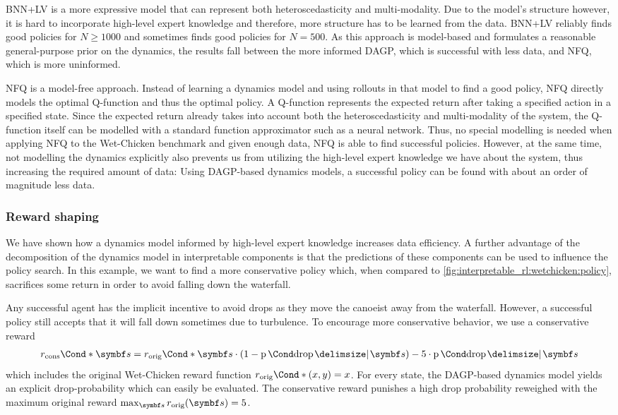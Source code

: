 BNN+LV is a more expressive model that can represent both heteroscedasticity and multi-modality.
Due to the model's structure however, it is hard to incorporate high-level expert knowledge and therefore, more structure has to be learned from the data.
BNN+LV reliably finds good policies for $N \geq 1000$ and sometimes finds good policies for $N = 500$.
As this approach is model-based and formulates a reasonable general-purpose prior on the dynamics, the results fall between the more informed DAGP, which is successful with less data, and NFQ, which is more uninformed.

NFQ is a model-free approach.
Instead of learning a dynamics model and using rollouts in that model to find a good policy, NFQ directly models the optimal Q-function and thus the optimal policy.
A Q-function represents the expected return after taking a specified action in a specified state.
Since the expected return already takes into account both the heteroscedasticity and multi-modality of the system, the Q-function itself can be modelled with a standard function approximator such as a neural network.
Thus, no special modelling is needed when applying NFQ to the Wet-Chicken benchmark and given enough data, NFQ is able to find successful policies.
However, at the same time, not modelling the dynamics explicitly also prevents us from utilizing the high-level expert knowledge we have about the system, thus increasing the required amount of data:
Using DAGP-based dynamics models, a successful policy can be found with about an order of magnitude less data.


\subsubsection{Reward shaping}
\label{toc:interpretable_rl:reward_shaping}
We have shown how a dynamics model informed by high-level expert knowledge increases data efficiency.
A further advantage of the decomposition of the dynamics model in interpretable components is that the predictions of these components can be used to influence the policy search.
In this example, we want to find a more conservative policy which, when compared to \cref{fig:interpretable_rl:wetchicken:policy}, sacrifices some return in order to avoid falling down the waterfall.

Any successful agent has the implicit incentive to avoid drops as they move the canoeist away from the waterfall.
However, a successful policy still accepts that it will fall down sometimes due to turbulence.
To encourage more conservative behavior, we use a conservative reward
\begin{align}
    \Fun*{r_\text{cons}}{\mat{s}} =
    \Fun*{r_\text{orig}}{\mat{s}} \cdot \left(1 - \Prob{\text{drop} \given \mat{s}}\right)
    - 5 \cdot \Prob{\text{drop} \given \mat{s}}
\end{align}
which includes the original Wet-Chicken reward function $\Fun*{r_\text{orig}}{(x, y)} = x$.
For every state, the DAGP-based dynamics model yields an explicit drop-probability which can easily be evaluated.
The conservative reward punishes a high drop probability reweighed with the maximum original reward $\max_{\mat{s}} r_\text{orig}(\mat{s}) = 5$.

